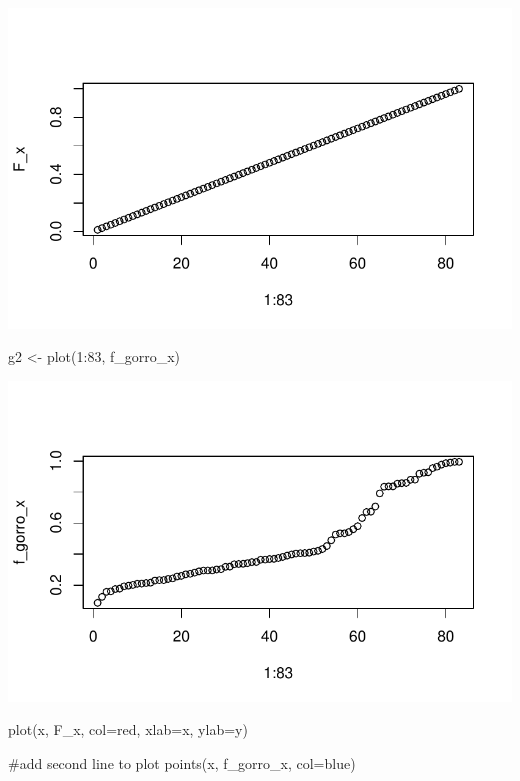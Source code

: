 \documentclass[
  us-letterpaper,
]{scrreprt}
\newenvironment{Shaded}{\begin{snugshade}}{\end{snugshade}}
\newcommand{\AttributeTok}[1]{\textcolor[rgb]{0.40,0.45,0.13}{#1}}
\newcommand{\CommentTok}[1]{\textcolor[rgb]{0.37,0.37,0.37}{#1}}
\newcommand{\DecValTok}[1]{\textcolor[rgb]{0.68,0.00,0.00}{#1}}
\newcommand{\FunctionTok}[1]{\textcolor[rgb]{0.28,0.35,0.67}{#1}}
\newcommand{\NormalTok}[1]{\textcolor[rgb]{0.00,0.23,0.31}{#1}}
\newcommand{\OtherTok}[1]{\textcolor[rgb]{0.00,0.23,0.31}{#1}}
\newcommand{\SpecialCharTok}[1]{\textcolor[rgb]{0.37,0.37,0.37}{#1}}
\newcommand{\StringTok}[1]{\textcolor[rgb]{0.13,0.47,0.30}{#1}}
\theoremstyle{definition}
\theoremstyle{plain}
\theoremstyle{plain}
\theoremstyle{remark}
\begin{document}
\includegraphics{Estudio_caso_files/figure-pdf/unnamed-chunk-27-1.pdf}

\begin{Shaded}
\begin{Highlighting}[]
\NormalTok{g2 }\OtherTok{\textless{}{-}} \FunctionTok{plot}\NormalTok{(}\DecValTok{1}\SpecialCharTok{:}\DecValTok{83}\NormalTok{, f\_gorro\_x) }
\end{Highlighting}
\end{Shaded}

\includegraphics{Estudio_caso_files/figure-pdf/unnamed-chunk-27-2.pdf}

\begin{Shaded}
\begin{Highlighting}[]
\FunctionTok{plot}\NormalTok{(x, F\_x, }\AttributeTok{col=}\StringTok{\textquotesingle{}red\textquotesingle{}}\NormalTok{, }\AttributeTok{xlab=}\StringTok{\textquotesingle{}x\textquotesingle{}}\NormalTok{, }\AttributeTok{ylab=}\StringTok{\textquotesingle{}y\textquotesingle{}}\NormalTok{)}

\CommentTok{\#add second line to plot }
\FunctionTok{points}\NormalTok{(x, f\_gorro\_x, }\AttributeTok{col=}\StringTok{\textquotesingle{}blue\textquotesingle{}}\NormalTok{)}
\end{Highlighting}
\end{Shaded}
\end{document}
